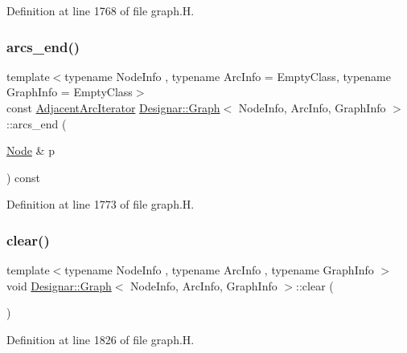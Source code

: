 Definition at line 1768 of file graph.\+H.

\mbox{\label{class_designar_1_1_graph_a305a413007d60401317366c92245bfa4}} 
\subsubsection{\texorpdfstring{arcs\+\_\+end()}{arcs\_end()}\hspace{0.1cm}{\footnotesize\ttfamily [4/4]}}
{\footnotesize\ttfamily template$<$typename Node\+Info , typename Arc\+Info  = Empty\+Class, typename Graph\+Info  = Empty\+Class$>$ \\
const \hyperlink{class_designar_1_1_graph_1_1_adjacent_arc_iterator}{Adjacent\+Arc\+Iterator} \hyperlink{class_designar_1_1_graph}{Designar\+::\+Graph}$<$ Node\+Info, Arc\+Info, Graph\+Info $>$\+::arcs\+\_\+end (\begin{DoxyParamCaption}\item[{\hyperlink{class_designar_1_1_graph_a5dfc7dba9d092ac489c72e40390c37d0}{Node} \&}]{p }\end{DoxyParamCaption}) const\hspace{0.3cm}{\ttfamily [inline]}}



Definition at line 1773 of file graph.\+H.

\mbox{\label{class_designar_1_1_graph_acfebca533d00dae0c40b0dd88f64296c}} 
\subsubsection{\texorpdfstring{clear()}{clear()}}
{\footnotesize\ttfamily template$<$typename Node\+Info , typename Arc\+Info , typename Graph\+Info $>$ \\
void \hyperlink{class_designar_1_1_graph}{Designar\+::\+Graph}$<$ Node\+Info, Arc\+Info, Graph\+Info $>$\+::clear (\begin{DoxyParamCaption}{ }\end{DoxyParamCaption})}



Definition at line 1826 of file graph.\+H.

